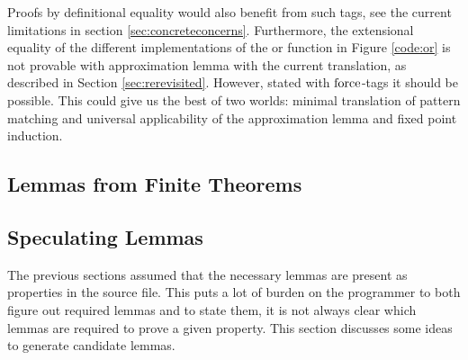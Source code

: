 Proofs by definitional equality would also benefit from such tags, see
the current limitations in section
\ref{sec:concreteconcerns}. Furthermore, the extensional equality of
the different implementations of the or function in Figure
\ref{code:or} is not provable with approximation lemma with the
current translation, as described in Section
\ref{sec:rerevisited}. However, stated with $\mathrm{force}$-tags it
should be possible. This could give us the best of two worlds: minimal
translation of pattern matching and universal applicability of the
approximation lemma and fixed point induction.

\subsection{Lemmas from Finite Theorems}

\begin{comment}

REWRITE - Fin predicate...

Fin(take n xs) <=> Fin(n) \/ Fin(xs)
Fin(xs ++ ys) <=> Fin(xs) /\ Fin(ys)p

Implementing addition of lemmas for properties that always hold, i.e,
for also partial and infinite values is straightforward; you can just
add the universally quantified property to the theory. The problem is
when it only holds for finite or total values: you will need FOL
predicates or functions to describe exactly when the property
holds. Research has been made how to use such predicates
\cite{sortMonotonicity}, \cite{polyMonotonicity}, but it is not
decided yet on which way to encode types. Furthermore, you will need
to prove that functions return finite or total values on such
input. For instance, append for lists gives a total list if both input
lists are total, but on the other hand, if the result list is total
but potentially infinite, we can only draw the conclusion that the
first list is total, since that might be the infinite one. So, to
prove properties that does not always hold you will need to prove a
lot more properties about your functions.

\end{comment}

\subsection{Speculating Lemmas}

The previous sections assumed that the necessary lemmas are present as
properties in the source file. This puts a lot of burden on the
programmer to both figure out required lemmas and to state them, it is
not always clear which lemmas are required to prove a given
property. This section discusses some ideas to generate candidate
lemmas.

